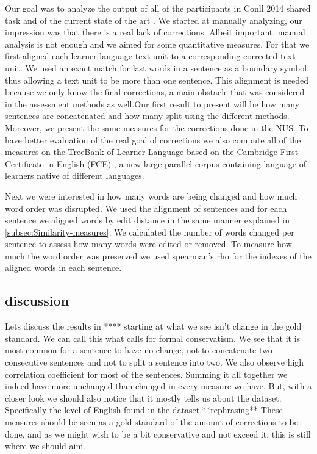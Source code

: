 \documentclass[english]{article}
\begin{document}
Our goal was to analyze the output of all of the participants in Conll
2014 shared task\cite{ng2014conll} and of the current state of the
art \cite{rozovskaya2014building}. We started at manually analyzing,
our impression was that there is a real lack of corrections. Albeit
important, manual analysis is not enough and we aimed for some quantitative
measures. For that we first aligned each learner language text unit
to a corresponding corrected text unit. We used an exact match for
last words in a sentence as a boundary symbol, thus allowing a text
unit to be more than one sentence. This alignment is needed because
we only know the final corrections, a main obstacle that was considered
in the assessment methods as well\cite{dahlmeier2012better}.Our first
result to present will be how many sentences are concatenated and
how many split using the different methods. Moreover, we present the
same measures for the corrections done in the NUS\cite{dahlmeier2013building}.
To have better evaluation of the real goal of corrections we also
compute all of the measures on the TreeBank of Learner Language \cite{berzak2016universal}based
on the Cambridge First Certificate in English (FCE) \cite{yannakoudakis2011new},
a new large parallel corpus containing language of learners native
of different languages.

Next we were interested in how many words are being changed and how
much word order was disrupted. We used the alignment of sentences
and for each sentence we aligned words by edit distance in the same
manner explained in \ref{subsec:Similarity-measures}. We calculated
the number of words changed per sentence to assess how many words
were edited or removed. To measure how much the word order was preserved
we used spearman's rho for the indexes of the aligned words in each
sentence.

\subsection{discussion}

Lets discuss the results in {*}{*}{*}{*} starting at what we see isn't
change in the gold standard. We can call this what calls for formal
conservatism. We see that it is most common for a sentence to have
no change, not to concatenate two consecutive sentences and not to
split a sentence into two. We also observe high correlation coefficient
for most of the sentences. Summing it all together we indeed have
more unchanged than changed in every measure we have. But, with a
closer look we should also notice that it mostly tells us about the
dataset. Specifically the level of English found in the dataset.{*}{*}rephrasing{*}{*}
These measures should be seen as a gold standard of the amount of
corrections to be done, and as we might wish to be a bit conservative
and not exceed it, this is still where we should aim.
\end{document}
